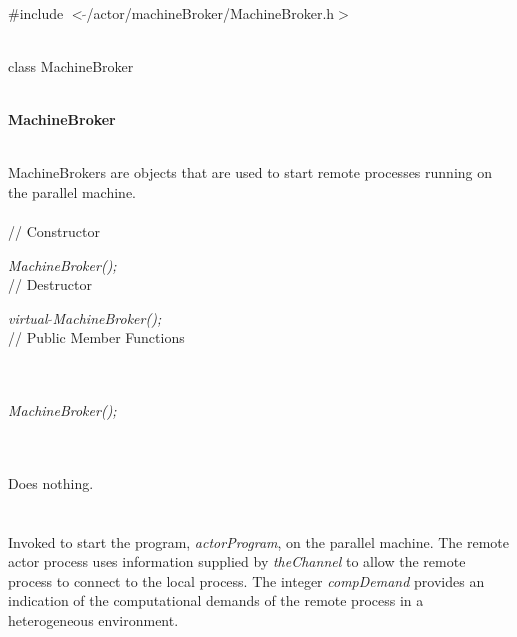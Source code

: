 
   \\
\#include $<\tilde{ }$/actor/machineBroker/MachineBroker.h$>$  


  \\
class MachineBroker 


 \\
{\bf MachineBroker} 


  \\
\indent MachineBrokers are objects that are used to start remote
processes running on the parallel machine. \\


  \\
// Constructor  

{\em MachineBroker();}  \\

// Destructor 

{\em virtual $\tilde{ }$MachineBroker();}\\  

// Public Member Functions  

\\

  \\
{\em MachineBroker();}  


 \\
\\ 
Does nothing. \\

  \\
\\
Invoked to start the program, {\em actorProgram}, on the parallel
machine. The remote actor process uses information supplied by {\em
theChannel} to allow the remote process to connect to the local
process. The integer {\em compDemand} provides an indication of the
computational demands of the remote process in a heterogeneous
environment. 